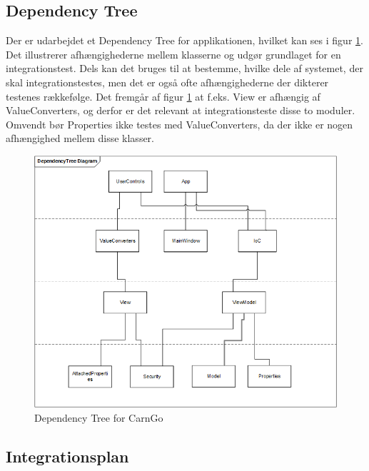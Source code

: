 \documentclass[Rapport/Rapport_main.tex]{subfiles}
\begin{document}
\subsection{Dependency Tree}
Der er udarbejdet et Dependency Tree for applikationen, hvilket kan ses i figur \ref{fig:dependency_tree}. Det illustrerer afhængighederne mellem klasserne og udgør grundlaget for en integrationstest. Dels kan det bruges til at bestemme, hvilke dele af systemet, der skal integrationstestes, men det er også ofte afhængighederne der dikterer testenes rækkefølge. Det fremgår af figur \ref{fig:dependency_tree} at f.eks. View er afhængig af ValueConverters, og derfor er det relevant at integrationsteste disse to moduler. Omvendt bør Properties ikke testes med ValueConverters, da der ikke er nogen afhængighed mellem disse klasser. 
\begin{figure}[H]
    \centering
    \includegraphics[width=\textwidth]{Rapport/Tests/DepedencyDiagramV2.png}
    \caption{Dependency Tree for CarnGo}
    \label{fig:dependency_tree}
\end{figure}

\subsection{Integrationsplan}
\end{document}
